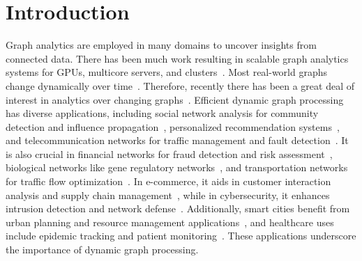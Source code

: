 \section{Introduction}

Graph analytics are employed in many domains to uncover insights from connected data. There has been much work resulting in scalable graph analytics systems for GPUs, multicore servers, and  clusters~\cite{pregel, graphlab, powergraph, galois, ligra, coral, gridgraph, graphchi, cusha, cusha2, tigr, gunrock, pingali, saday}. Most real-world graphs change dynamically over time~\cite{sakr-21}. Therefore, recently there has been a great deal of interest in analytics over changing graphs~\cite{kickstarter,graphbolt,risgraph,CommonGraph,tegra,evog-taco,chronos}. Efficient dynamic graph processing has diverse applications, including social network analysis for community detection and influence propagation~\cite{aggarwal2014, giatsidis2011d}, personalized recommendation systems~\cite{amatriain2015recommender, koren2009matrix}, and telecommunication networks for traffic management and fault detection~\cite{nguyen2018survey, li2017survey}. It is also crucial in financial networks for fraud detection and risk assessment~\cite{akoglu2015graph, kumar2016edge}, biological networks like gene regulatory networks~\cite{liu2018dynamic, zhang2012inferring}, and transportation networks for traffic flow optimization~\cite{wang2016dynamic, zheng2013u}. In e-commerce, it aids in customer interaction analysis and supply chain management~\cite{yan2017survey, ngai2012information}, while in cybersecurity, it enhances intrusion detection and network defense~\cite{ahmed2016survey, garcia2014empirical}. Additionally, smart cities benefit from urban planning and resource management applications~\cite{batty2012smart, neirotti2014current}, and healthcare uses include epidemic tracking and patient monitoring~\cite{he2016dynamic, rumsfeld2016big}. These applications underscore the importance of dynamic graph processing.


